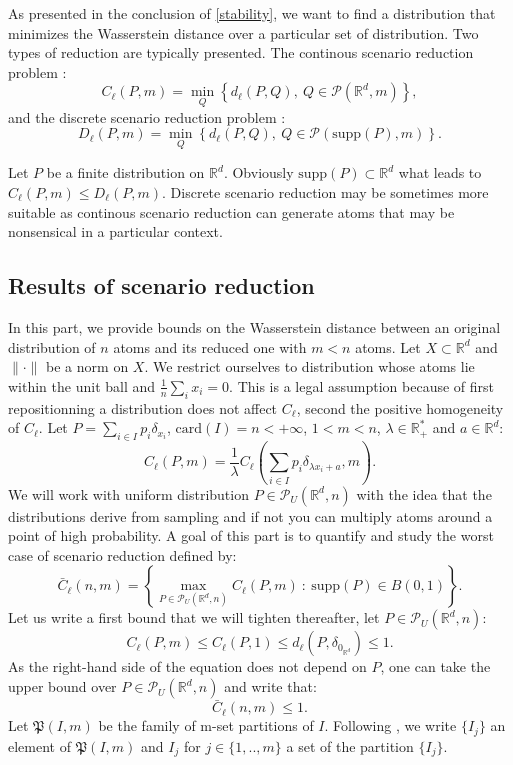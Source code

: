 \documentclass{amsart}
\newcommand{\RR}{\mathbb{R}}
\begin{document}
As presented in the conclusion of \ref{stability}, we want to find a distribution that minimizes the Wasserstein distance over a particular set of distribution. Two types of reduction are typically presented. The continous scenario reduction problem :
$$
C_\ell(P,m)=\min_Q\left\{d_\ell(P,Q),\: Q\in\mathcal{P}(\mathbb{R}^d,m)\right\}, 
$$
and the discrete scenario reduction problem :
$$
D_\ell(P,m)=\min_Q\left\{d_\ell(P,Q),\: Q\in\mathcal{P}(\text{supp}(P),m)\right\}.
$$

Let $P$ be a finite distribution on $\RR^d$. Obviously $\text{supp}(P)\subset \RR^d$ what leads to $C_\ell(P,m)\leq D_\ell(P,m)$. Discrete scenario reduction may be sometimes more suitable as continous scenario reduction can generate atoms that may be nonsensical in a particular context.

\subsection{Results of scenario reduction}
In this part, we provide bounds on the Wasserstein distance between an original distribution of $n$ atoms and its reduced one with $m<n$ atoms. Let $X\subset \RR^d$ and $\lVert \cdot \rVert$ be a norm on $X$. We restrict ourselves to distribution whose atoms lie within the unit ball and $\frac{1}{n}\sum_ix_i=0$. This is a legal assumption because of first repositionning a distribution does not affect $C_\ell$, second the positive homogeneity of $C_\ell$. Let $P=\sum_{i\in I}p_i\delta_{x_i}$, $\text{card}\left(I\right)=n<+\infty$, $1<m<n$, $\lambda\in\RR_+^*$ and $a\in\RR^d$:
$$
C_\ell\left(P,m\right)=\frac{1}{\lambda} C_\ell\left(\sum_{i\in I}p_i\delta_{\lambda x_i+a},m\right).
$$
We will work with uniform distribution $P\in\mathcal{P}_U\left(\RR^d,n\right)$ with the idea that the distributions derive from sampling and if not you can multiply atoms around a point of high probability. A goal of this part is to quantify and study the worst case of scenario reduction defined by:
$$    \bar{C}_\ell\left(n,m \right)=\left\{\max_{P\in\mathcal{P}_U(\mathbb{R}^d,n)}C_\ell(P,m)\: :\: \text{supp}(P)\in B(0,1)\right\}.
$$
Let us write a first bound that we will tighten thereafter, let $P\in\mathcal{P}_U(\mathbb{R}^d,n)$:
$$C_\ell\left(P,m\right)\leq C_\ell\left(P,1\right)\leq d_\ell\left(P,\delta_{0_{\RR^d}}\right)\leq 1.$$
As the right-hand side of the equation does not depend on $P$, one can take the upper bound over $P\in\mathcal{P}_U\left(\RR^d,n\right)$ and write that:
$$
\bar{C}_\ell\left(n,m \right)\leq1.
$$
Let $\mathfrak{P}(I,m)$ be the family of m-set partitions of $I$. Following \cite{rujeerapaiboon_scenario_2022}, we write $\{I_j\}$ an element of $\mathfrak{P}(I,m)$ and $I_j$ for $j\in\{1,..,m\}$ a set of the partition $\{I_j\}$.
\end{document}
